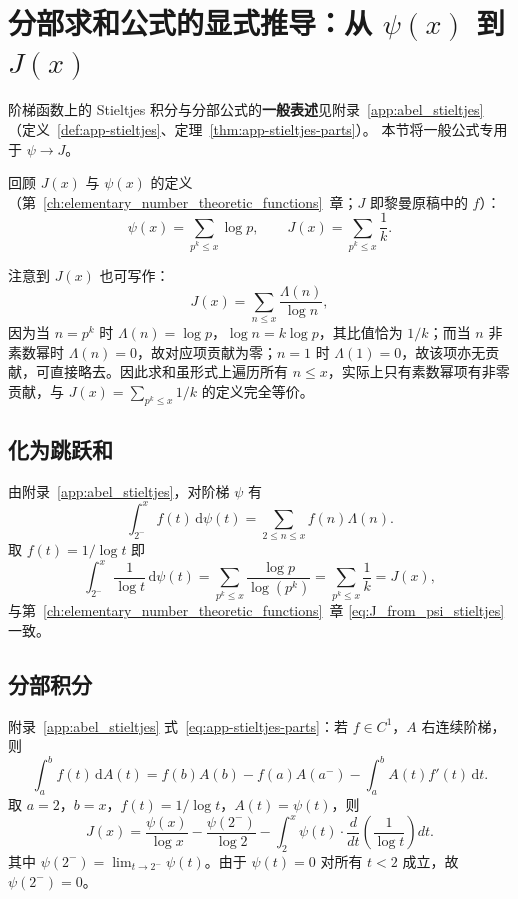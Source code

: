 \section{分部求和公式的显式推导：从 \texorpdfstring{$\psi(x)$}{psi(x)} 到 \texorpdfstring{$J(x)$}{J(x)}}\label{sec:integration-by-parts}

阶梯函数上的 Stieltjes 积分与分部公式的\textbf{一般表述}见附录~\ref{app:abel_stieltjes}
（定义~\ref{def:app-stieltjes}、定理~\ref{thm:app-stieltjes-parts}）。
本节将一般公式专用于 $\psi\to J$。

回顾 $J(x)$ 与 $\psi(x)$ 的定义
（第~\ref{ch:elementary_number_theoretic_functions}~章；$J$ 即黎曼原稿中的 $f$）：
\[
\psi(x) = \sum_{p^k\le x} \log p,\qquad 
J(x) = \sum_{p^k\le x} \frac{1}{k}.
\]

注意到 $J(x)$ 也可写作：
\[
J(x) = \sum_{n\le x} \frac{\Lambda(n)}{\log n},
\]
因为当 $n=p^k$ 时 $\Lambda(n)=\log p$，$\log n = k\log p$，其比值恰为 $1/k$；而当 $n$ 非素数幂时 $\Lambda(n)=0$，故对应项贡献为零；$n=1$ 时 $\Lambda(1)=0$，故该项亦无贡献，可直接略去。因此求和虽形式上遍历所有 $n\le x$，实际上只有素数幂项有非零贡献，与 $J(x)=\sum_{p^k\le x} 1/k$ 的定义完全等价。

\subsection*{化为跳跃和}

由附录~\ref{app:abel_stieltjes}，对阶梯 $\psi$ 有
\[
\int_{2^-}^x f(t)\, \mathrm{d}\psi(t) = \sum_{2 \le n \le x} f(n)\Lambda(n).
\]
取 $f(t)=1/\log t$ 即
\[
\int_{2^-}^{x} \frac{1}{\log t}\, \mathrm{d}\psi(t)
= \sum_{p^k \le x} \frac{\log p}{\log(p^k)}
= \sum_{p^k \le x} \frac{1}{k} = J(x),
\]
与第~\ref{ch:elementary_number_theoretic_functions}~章 \eqref{eq:J_from_psi_stieltjes} 一致。

\subsection*{分部积分}

附录~\ref{app:abel_stieltjes} 式~\eqref{eq:app-stieltjes-parts}：若 $f\in C^1$，$A$ 右连续阶梯，则
\[
\int_a^b f(t)\, \mathrm{d}A(t) = f(b)A(b) - f(a)A(a^-) - \int_a^b A(t)f'(t)\, \mathrm{d}t.
\]
取 $a=2$，$b=x$，$f(t)=1/\log t$，$A(t)=\psi(t)$，则
\[
J(x) = \frac{\psi(x)}{\log x} - \frac{\psi(2^-)}{\log 2} - \int_2^x \psi(t)\cdot \frac{d}{dt}\!\left(\frac{1}{\log t}\right) dt.
\]
其中 $\psi(2^-)=\lim_{t\to 2^-}\psi(t)$。由于 $\psi(t)=0$ 对所有 $t<2$ 成立，故 $\psi(2^-)=0$。

